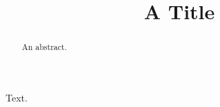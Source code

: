 \documentclass{ptephy_v1}
\begin{document}
\title{A Title}
\author{}
\address{Univ A, Tokyo
}
\begin{abstract}An abstract.\end{abstract}
\maketitle
Text.
\end{document}
